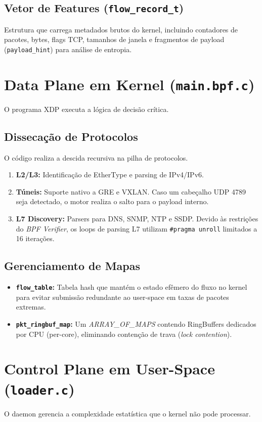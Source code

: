 \documentclass[a4paper,12pt]{article}
\begin{document}
\subsection{Vetor de Features (\texttt{flow\_record\_t})}
Estrutura que carrega metadados brutos do kernel, incluindo contadores de pacotes, bytes, flags TCP, tamanhos de janela e fragmentos de payload (\texttt{payload\_hint}) para análise de entropia.

\section{Data Plane em Kernel (\texttt{main.bpf.c})}
O programa XDP executa a lógica de decisão crítica.

\subsection{Dissecação de Protocolos}
O código realiza a descida recursiva na pilha de protocolos. 
\begin{enumerate}
    \item \textbf{L2/L3:} Identificação de EtherType e parsing de IPv4/IPv6.
    \item \textbf{Túneis:} Suporte nativo a GRE e VXLAN. Caso um cabeçalho UDP 4789 seja detectado, o motor realiza o salto para o payload interno.
    \item \textbf{L7 Discovery:} Parsers para DNS, SNMP, NTP e SSDP. Devido às restrições do \textit{BPF Verifier}, os loops de parsing L7 utilizam \texttt{\#pragma unroll} limitados a 16 iterações.
\end{enumerate}

\subsection{Gerenciamento de Mapas}
\begin{itemize}
    \item \textbf{\texttt{flow\_table}:} Tabela hash que mantém o estado efêmero do fluxo no kernel para evitar submissão redundante ao user-space em taxas de pacotes extremas.
    \item \textbf{\texttt{pkt\_ringbuf\_map}:} Um \textit{ARRAY\_OF\_MAPS} contendo RingBuffers dedicados por CPU (per-core), eliminando contenção de trava (\textit{lock contention}).
\end{itemize}

\section{Control Plane em User-Space (\texttt{loader.c})}
O daemon gerencia a complexidade estatística que o kernel não pode processar.
\end{document}
